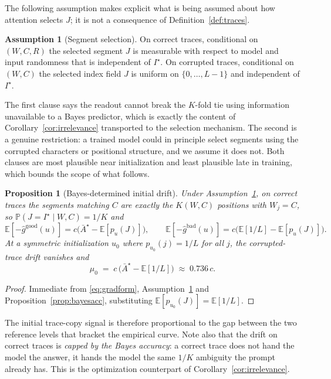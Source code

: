 \documentclass{article}
\theoremstyle{plain}
\newtheorem{proposition}{Proposition}
\theoremstyle{definition}
\newtheorem{assumption}{Assumption}
\theoremstyle{remark}
\newcommand{\E}{\mathbb{E}}
\newcommand{\Prob}{\mathbb{P}}
\newcommand{\1}{\mathbf{1}}
\newcommand{\good}{\mathrm{good}}
\newcommand{\bad}{\mathrm{bad}}
\begin{document}
The following assumption makes explicit what is being assumed about how attention
selects $J$; it is not a consequence of Definition~\ref{def:traces}.

\begin{assumption}[Segment selection]
\label{ass:selection}
On correct traces, conditional on $(W,C,R)$ the selected segment $J$ is
measurable with respect to model and input randomness that is independent of
$I^\star$. On corrupted traces, conditional on $(W,C)$ the selected index field
$J$ is uniform on $\{0,\dots,L-1\}$ and independent of $I^\star$.
\end{assumption}

The first clause says the readout cannot break the $K$-fold tie using information
unavailable to a Bayes predictor, which is exactly the content of
Corollary~\ref{cor:irrelevance} transported to the selection mechanism. The
second is a genuine restriction: a trained model could in principle select
segments using the corrupted characters or positional structure, and we assume it
does not. Both clauses are most plausible near initialization and least plausible
late in training, which bounds the scope of what follows.

\begin{proposition}[Bayes-determined initial drift]
\label{prop:mu0}
Under Assumption~\ref{ass:selection}, on correct traces the segments matching $C$
are exactly the $K(W,C)$ positions with $W_j = C$, so
$\Prob(J = I^\star\mid W,C) = 1/K$ and
\begin{equation}
\label{eq:gooddrift}
\E[-\hat g^{\good}(u)] = c\big(\bar A^\star - \E[p_u(J)]\big),
\qquad
\E[-\hat g^{\bad}(u)] = c\big(\E[1/L] - \E[p_u(J)]\big).
\end{equation}
At a symmetric initialization $u_0$ where $p_{u_0}(j) = 1/L$ for all $j$, the
corrupted-trace drift vanishes and
\begin{equation}
\label{eq:mu0}
\mu_0 \;=\; c\,\big(\bar A^\star - \E[1/L]\big) \;\approx\; 0.736\,c .
\end{equation}
\end{proposition}

\begin{proof}
Immediate from \eqref{eq:gradform}, Assumption~\ref{ass:selection} and
Proposition~\ref{prop:bayesacc}, substituting $\E[p_{u_0}(J)] = \E[1/L]$.
\end{proof}

The initial trace-copy signal is therefore proportional to the gap between the
two reference levels that bracket the empirical curve. Note also that the drift
on correct traces is \emph{capped by the Bayes accuracy}: a correct trace does
not hand the model the answer, it hands the model the same $1/K$ ambiguity the
prompt already has. This is the optimization counterpart of
Corollary~\ref{cor:irrelevance}.
\end{document}
